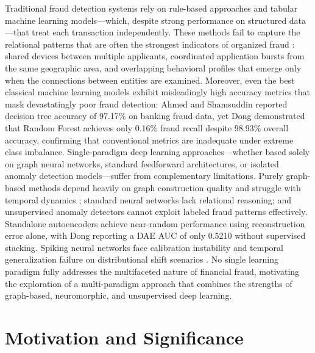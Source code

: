 Traditional fraud detection systems rely on rule-based approaches and tabular machine learning models---which, despite strong performance on structured data \cite{grinsztajn2022tree}---that treat each transaction independently. These methods fail to capture the relational patterns that are often the strongest indicators of organized fraud \cite{pourhabibi2022graph}: shared devices between multiple applicants, coordinated application bursts from the same geographic area, and overlapping behavioral profiles that emerge only when the connections between entities are examined. Moreover, even the best classical machine learning models exhibit misleadingly high accuracy metrics that mask devastatingly poor fraud detection: Ahmed and Shamsuddin \cite{ahmed2022comparative} reported decision tree accuracy of 97.17\% on banking fraud data, yet Dong \cite{dong2025enhanced} demonstrated that Random Forest achieves only 0.16\% fraud recall despite 98.93\% overall accuracy, confirming that conventional metrics are inadequate under extreme class imbalance. Single-paradigm deep learning approaches---whether based solely on graph neural networks, standard feedforward architectures, or isolated anomaly detection models---suffer from complementary limitations. Purely graph-based methods depend heavily on graph construction quality and struggle with temporal dynamics \cite{vanderhulst2024graph}; standard neural networks lack relational reasoning; and unsupervised anomaly detectors cannot exploit labeled fraud patterns effectively. Standalone autoencoders achieve near-random performance using reconstruction error alone, with Dong \cite{dong2025enhanced} reporting a DAE AUC of only 0.5210 without supervised stacking. Spiking neural networks face calibration instability and temporal generalization failure on distributional shift scenarios \cite{ahmed2025bioinspired}. No single learning paradigm fully addresses the multifaceted nature of financial fraud, motivating the exploration of a multi-paradigm approach that combines the strengths of graph-based, neuromorphic, and unsupervised deep learning.

\section{Motivation and Significance}


